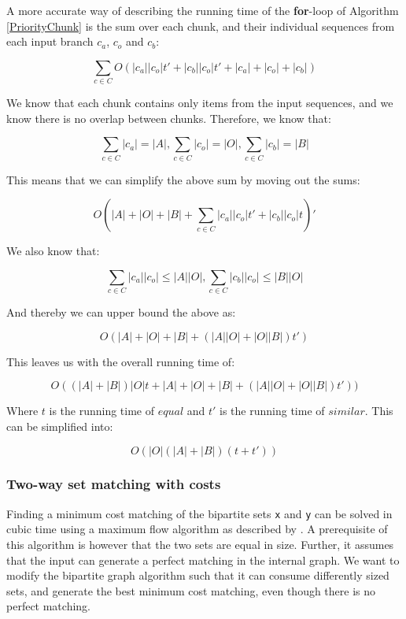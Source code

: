 \documentclass[11pt]{article}
\begin{document}
A more accurate way of describing the running time of the \textbf{for}-loop of Algorithm \ref{PriorityChunk} is the sum over each chunk, and their individual sequences from each input branch $c_a$, $c_o$ and $c_b$:

\begin{equation}
\sum_{c \in C} O(|c_a||c_o|t' + |c_b||c_o|t' + |c_a|+|c_o|+|c_b|) \nonumber
\end{equation}

We know that each chunk contains only items from the input sequences, and we know there is no overlap between chunks. Therefore, we know that:

\begin{equation}
\sum_{c \in C} |c_a| = |A| \nonumber
, \sum_{c \in C} |c_o| = |O| \nonumber
, \sum_{c \in C} |c_b| = |B| \nonumber
\end{equation}

This means that we can simplify the above sum by moving out the sums:

\begin{equation}
O(|A| + |O| + |B| + \sum_{c \in C} |c_a||c_o|t' + |c_b||c_o|t)' \nonumber
\end{equation}

We also know that:

\begin{equation}
\sum_{c \in C} |c_a||c_o| \leq |A||O| , 
\sum_{c \in C} |c_b||c_o| \leq |B||O| \nonumber
\end{equation}

And thereby we can upper bound the above as:

\begin{equation}
O(|A| + |O| + |B| + (|A| |O| + |O| |B|) t') \nonumber
\end{equation}

This leaves us with the overall running time of:

\begin{equation}
O((|A| + |B|)|O|t + |A|+|O|+|B| + (|A| |O| + |O| |B|) t')) \nonumber
\end{equation}

Where $t$ is the running time of $equal$ and $t'$ is the running time of $similar$. This can be simplified into:

\begin{equation}
O(|O| (|A| + |B|)(t + t')) \nonumber
\end{equation}

\subsubsection{Two-way set matching with costs}
Finding a minimum cost matching of the bipartite sets \texttt{x} and \texttt{y} can be solved in cubic time using a maximum flow algorithm as described by \citet{bipartitecost}. A prerequisite of this algorithm is however that the two sets are equal in size. Further, it assumes that the input can generate a perfect matching in the internal graph. We want to modify the bipartite graph algorithm such that it can consume differently sized sets, and generate the best minimum cost matching, even though there is no perfect matching.
\end{document}
